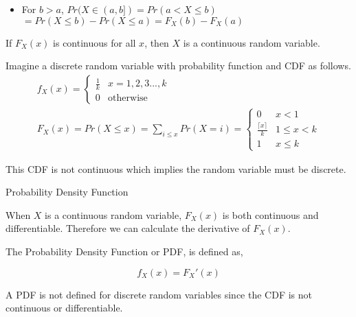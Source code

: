 \documentclass{report}
\begin{document}
\begin{description}
\begin{mdframed}
\begin{itemize}
                \item For $b > a$,  $Pr(X \in (a, b]) = Pr(a < X \le b)$\\
                     $= Pr(X \le b) - Pr(X \le a) = F_X(b) - F_X(a)$ 
            \end{itemize}

            If $F_X(x)$ is continuous for all  $x$, then $X$ is
            a continuous random variable.


            Imagine a discrete random variable with probability
            function and CDF as follows.
            \begin{gather}
               f_X(x) = 
               \begin{cases}
                   \frac{1}{k} & x = 1, 2, 3 ..., k\\ 
                   0 & \textrm{otherwise}
               \end{cases}\\
               F_X(x) = Pr(X \le x) = \sum_{i \le x} Pr(X = i) =
               \begin{cases}
                   0 & x<1\\ 
                   \frac{\lceil x \rceil}{k} & 1 \le x < k\\
                   1 & x \le k
               \end{cases}
            \end{gather}

            This CDF is not continuous which implies the random
            variable must be discrete.
        \end{mdframed}
        \pagebreak
    \item {\Large Probability Density Function}
        \begin{mdframed}
            When $X$ is a continuous random variable,
             $F_X(x)$ is both continuous and differentiable.
             Therefore we can calculate the derivative
             of  $F_X(x)$.

             The Probability Density Function or PDF, is
             defined as,

             \begin{displaymath}
                f_X(x) = F_X'(x)
             \end{displaymath}

             A PDF is not defined for discrete random variables
             since the CDF is not continuous or differentiable.
             

\end{mdframed}
\end{description}
\end{document}
